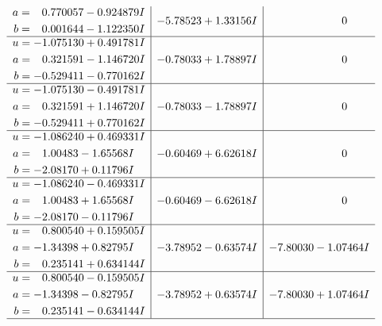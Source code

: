 \documentclass[1p]{elsarticle_modified}
\theoremstyle{definition}
\begin{document}
$$\begin{array}{c|c|c}
\begin{aligned}
a &= \phantom{-}0.770057 - 0.924879 I \\
b &= \phantom{-}0.001644 - 1.122350 I\end{aligned}
 & -5.78523 + 1.33156 I & \phantom{-0.000000 } 0 \\ \hline\begin{aligned}
u &= -1.075130 + 0.491781 I \\
a &= \phantom{-}0.321591 - 1.146720 I \\
b &= -0.529411 - 0.770162 I\end{aligned}
 & -0.78033 + 1.78897 I & \phantom{-0.000000 } 0 \\ \hline\begin{aligned}
u &= -1.075130 - 0.491781 I \\
a &= \phantom{-}0.321591 + 1.146720 I \\
b &= -0.529411 + 0.770162 I\end{aligned}
 & -0.78033 - 1.78897 I & \phantom{-0.000000 } 0 \\ \hline\begin{aligned}
u &= -1.086240 + 0.469331 I \\
a &= \phantom{-}1.00483 - 1.65568 I \\
b &= -2.08170 + 0.11796 I\end{aligned}
 & -0.60469 + 6.62618 I & \phantom{-0.000000 } 0 \\ \hline\begin{aligned}
u &= -1.086240 - 0.469331 I \\
a &= \phantom{-}1.00483 + 1.65568 I \\
b &= -2.08170 - 0.11796 I\end{aligned}
 & -0.60469 - 6.62618 I & \phantom{-0.000000 } 0 \\ \hline\begin{aligned}
u &= \phantom{-}0.800540 + 0.159505 I \\
a &= -1.34398 + 0.82795 I \\
b &= \phantom{-}0.235141 + 0.634144 I\end{aligned}
 & -3.78952 - 0.63574 I & -7.80030 - 1.07464 I \\ \hline\begin{aligned}
u &= \phantom{-}0.800540 - 0.159505 I \\
a &= -1.34398 - 0.82795 I \\
b &= \phantom{-}0.235141 - 0.634144 I\end{aligned}
 & -3.78952 + 0.63574 I & -7.80030 + 1.07464 I\\
 \hline 
 \end{array}$$\newpage$$\begin{array}{c|c|c}  

\end{array}$$
\end{document}
